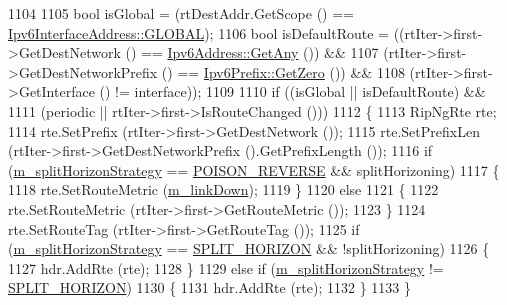 \begin{DoxyCode}
1104 
1105               \textcolor{keywordtype}{bool} isGlobal = (rtDestAddr.GetScope () == 
      \hyperlink{classns3_1_1Ipv6InterfaceAddress_ad3f03debf9dae475b81ea9cdf81f4f27aaf504a3b8c1562206e6ba65b4a6cff1d}{Ipv6InterfaceAddress::GLOBAL});
1106               \textcolor{keywordtype}{bool} isDefaultRoute = ((rtIter->first->GetDestNetwork () == 
      \hyperlink{classns3_1_1Ipv6Address_a2783e8badfc98c8b0a8508bba6e1b91e}{Ipv6Address::GetAny} ()) &&
1107                   (rtIter->first->GetDestNetworkPrefix () == \hyperlink{classns3_1_1Ipv6Prefix_ab32d2dbadcd8fa048ff296cb0a0e34ff}{Ipv6Prefix::GetZero} ()) &&
1108                   (rtIter->first->GetInterface () != interface));
1109 
1110               \textcolor{keywordflow}{if} ((isGlobal || isDefaultRoute) &&
1111                   (periodic || rtIter->first->IsRouteChanged ()))
1112                 \{
1113                   RipNgRte rte;
1114                   rte.SetPrefix (rtIter->first->GetDestNetwork ());
1115                   rte.SetPrefixLen (rtIter->first->GetDestNetworkPrefix ().GetPrefixLength ());
1116                   \textcolor{keywordflow}{if} (\hyperlink{classns3_1_1RipNg_a2aaaf4747380a0960cc48cb04ae99a1a}{m\_splitHorizonStrategy} == 
      \hyperlink{classns3_1_1RipNg_a2baa3148870b411bccfe688079fb40a7a68187e765b02506b3891b87a513fac2f}{POISON\_REVERSE} && splitHorizoning)
1117                     \{
1118                       rte.SetRouteMetric (\hyperlink{classns3_1_1RipNg_a6752c1bb1fc0909f0493033d426f2b92}{m\_linkDown});
1119                     \}
1120                   \textcolor{keywordflow}{else}
1121                     \{
1122                       rte.SetRouteMetric (rtIter->first->GetRouteMetric ());
1123                     \}
1124                   rte.SetRouteTag (rtIter->first->GetRouteTag ());
1125                   \textcolor{keywordflow}{if} (\hyperlink{classns3_1_1RipNg_a2aaaf4747380a0960cc48cb04ae99a1a}{m\_splitHorizonStrategy} == 
      \hyperlink{classns3_1_1RipNg_a2baa3148870b411bccfe688079fb40a7a65efd4b3a6b5b8be8e16038fec0cad4e}{SPLIT\_HORIZON} && !splitHorizoning)
1126                     \{
1127                       hdr.AddRte (rte);
1128                     \}
1129                   \textcolor{keywordflow}{else} \textcolor{keywordflow}{if} (\hyperlink{classns3_1_1RipNg_a2aaaf4747380a0960cc48cb04ae99a1a}{m\_splitHorizonStrategy} != 
      \hyperlink{classns3_1_1RipNg_a2baa3148870b411bccfe688079fb40a7a65efd4b3a6b5b8be8e16038fec0cad4e}{SPLIT\_HORIZON})
1130                     \{
1131                       hdr.AddRte (rte);
1132                     \}
1133                 \}

\end{DoxyCode}
